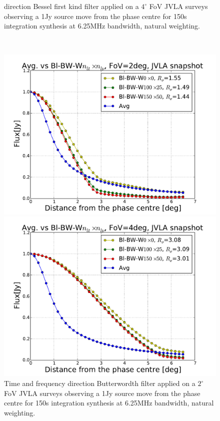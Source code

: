 \documentclass[useAMS,usenatbib]{mn2e}
\begin{document}
\begin{figure}
\begin{minipage}{0.38\linewidth}
{  direction Bessel first kind filter applied on a $4^{\circ}$ FoV JVLA surveys observing a 1Jy source move from the phase centre for 150s 
  integration synthesis at 6.25MHz bandwidth, natural weighting.}\label{fig:Bl-bessel-FoV4}\end{minipage}\\
  \begin{minipage}{0.38\linewidth}\includegraphics[width=1\textwidth]{./Figures/Bl-butter-FoV2-vla.pdf}\caption{Time and frequency 
  direction Butterwordth filter applied on a $2^{\circ}$ FoV JVLA surveys observing a 1Jy source move from the phase centre for 
  150s integration synthesis at 6.25MHz bandwidth, natural weighting.}\label{fig:Bl-butter-FoV2}\end{minipage}
  \hspace{1cm}
  \begin{minipage}{0.38\linewidth}
  \includegraphics[width=1\textwidth]{./Figures/Bl-butter-FoV4-vla.pdf}

\end{minipage}
\end{figure}
\end{document}
